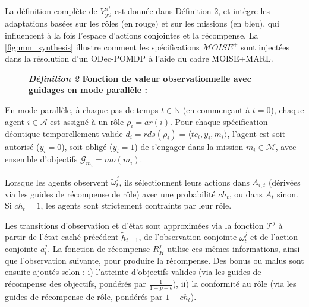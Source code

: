 La définition complète de $V_{\mathcal{T}^j}^{\pi^j}$ est donnée dans \hyperref[eq:single_value_function]{Définition 2}, et intègre les adaptations basées sur les rôles (en rouge) et sur les missions (en bleu), qui influencent à la fois l'espace d'actions conjointes et la récompense. La \autoref{fig:mm_synthesis} illustre comment les spécifications $\mathcal{M}OISE^+$ sont injectées dans la résolution d'un \ac{ODec-POMDP} à l'aide du cadre MOISE+MARL.

\begin{figure}[h!]
    \label{eq:single_value_function}
    \raggedright
    \textbf{\textit{Définition 2} \quad Fonction de valeur observationnelle avec guidages en mode parallèle :}

    \begin{scriptsize}
    \end{scriptsize}
\end{figure}

\noindent En mode parallèle, à chaque pas de temps $t \in \mathbb{N}$ (en commençant à $t=0$), chaque agent $i \in \mathcal{A}$ est assigné à un rôle $\rho_i = ar(i)$. Pour chaque spécification déontique temporellement valide $d_i = rds(\rho_i) = \langle tc_i, y_i, m_i \rangle$, l'agent est soit autorisé ($y_i = 0$), soit obligé ($y_i = 1$) de s'engager dans la mission $m_i \in \mathcal{M}$, avec ensemble d'objectifs $\mathcal{G}_{m_i} = mo(m_i)$.

Lorsque les agents observent $\tilde{\omega}_t^j$, ils sélectionnent leurs actions dans $A_{i,t}$ (dérivées via les guides de récompense de rôle) avec une probabilité $ch_t$, ou dans $A_t$ sinon. Si $ch_t = 1$, les agents sont strictement contraints par leur rôle.

Les transitions d'observation et d'état sont approximées via la fonction $\mathcal{T}^j$ à partir de l'état caché précédent $\tilde{h}_{t-1}$, de l'observation conjointe $\omega^j_t$ et de l'action conjointe $a^j_t$. La fonction de récompense $R^j_H$ utilise ces mêmes informations, ainsi que l'observation suivante, pour produire la récompense. Des bonus ou malus sont ensuite ajoutés selon :
i) l'atteinte d'objectifs valides (via les guides de récompense des objectifs, pondérés par $\frac{1}{1 - p + \epsilon}$),
ii) la conformité au rôle (via les guides de récompense de rôle, pondérés par $1 - ch_t$).

